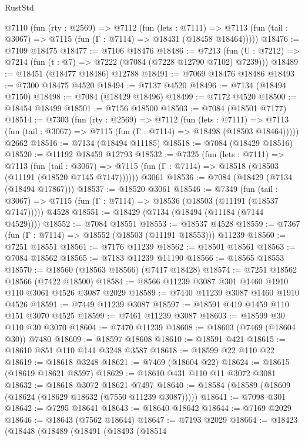 \begin{lexlean}{RustStd}
\begin{coremodule}
  @7110
    (fun (rty : @2569) =>
    @7112
      (fun (lets : @7111) =>
      @7113 (fun (tail : @3067) => @7115 (fun (Γ : @7114) => @18431 (@18458 @18464)))))
@18476 := @7109 @18475
@18477 := @7106 @18476
@18486 := @7213
    (fun (U : @7212) => @7214 (fun (t : @7) => @7222 (@7084 (@7228 @12790 @7102) @7239)))
@18489 := @18451 (@18477 @18486) @12788
@18491 := @7069 @18476 @18486
@18493 := @7300 @18475 @4520
@18494 := @7137 @4520
@18496 := @7134 (@18494 @7150)
@18498 := @7084 (@18429 @18496)
@18499 := @7172 @4520
@18500 := @18454 @18499
@18501 := @7156 @18500
@18503 := @7084 (@18501 @7177)
@18514 := @7303
    (fun (rty : @2569) =>
    @7112
      (fun (lets : @7111) =>
      @7113 (fun (tail : @3067) => @7115 (fun (Γ : @7114) => @18498 (@18503 @18464)))))
    @2662
@18516 := @7134 (@18494 @11185)
@18518 := @7084 (@18429 @18516)
@18520 := @11192 @18459 @12793
@18532 := @7325
    (fun (lets : @7111) =>
    @7113
      (fun (tail : @3067) =>
      @7115 (fun (Γ : @7114) => @18518 (@18503 (@11191 (@18520 @7145 @7147))))))
    @3061
@18536 := @7084 (@18429 (@7134 (@18494 @17867)))
@18537 := @18520 @3061
@18546 := @7349
    (fun (tail : @3067) => @7115 (fun (Γ : @7114) => @18536 (@18503 (@11191 (@18537 @7147)))))
    @4528
@18551 := @18429 (@7134 (@18494 (@11184 (@7144 @4529))))
@18552 := @7084 @18551
@18553 := @18537 @4528
@18559 := @7367 (fun (Γ : @7114) => @18552 (@18503 (@11191 @18553))) @11239
@18560 := @7251 @18551
@18561 := @7176 @11239
@18562 := @18501 @18561
@18563 := @7084 @18562
@18565 := @7183 @11239 @11190
@18566 := @18565 @18553
@18570 := @18560 (@18563 @18566) (@7417 @18428)
@18574 := @7251 @18562 @18566 (@7422 @18500)
@18584 := @8566 @11239 @3087 @301 @1460 @1910 @110 @3061 @4526 @3087 @2029
@18589 := @7440 @11239 @3087 @1460 @1910 @4526
@18591 := @7449 @11239 @3087
@18597 := @18591 @419 @1459 @110 @151 @3070 @4525
@18599 := @7461 @11239 @3087
@18603 := @18599 @30 @110 @30 @3070
@18604 := @7470 @11239
@18608 := @18603 (@7469 (@18604 @30)) @7480
@18609 := @18597 @18608
@18610 := @18591 @421
@18615 := @18610 @851 @110 @141 @3248 @3587
@18618 := @18599 @22 @110 @22
@18619 := @18618 @3248
@18621 := @7469 (@18604 @22)
@18624 := @18615 (@18619 @18621 @8597)
@18629 := @18610 @431 @110 @11 @3072 @3081
@18632 := @18618 @3072 @18621 @7497
@18640 := @18584 (@18589 (@18609 (@18624 (@18629 @18632 (@7550 @11239 @3087)))))
@18641 := @7098 @301
@18642 := @7295 @18641
@18643 := @18640 @18642
@18644 := @7169 @2029
@18646 := @18643 (@7562 @18644)
@18647 := @7193 @2029
@18664 := @18423
    (@18448
      (@18489
        (@18491
          (@18493
            (@18514

\end{coremodule}
\end{lexlean}
